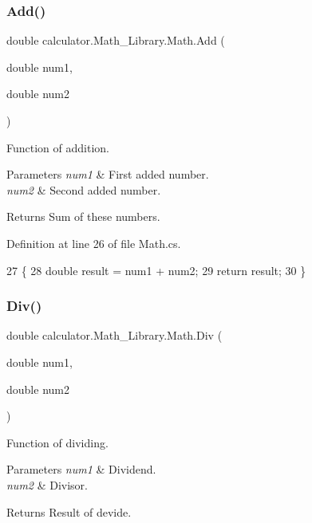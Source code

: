 \subsubsection{Add()}
{\footnotesize\ttfamily double calculator.\+Math\+\_\+\+Library.\+Math.\+Add (\begin{DoxyParamCaption}\item[{double}]{num1,  }\item[{double}]{num2 }\end{DoxyParamCaption})}



Function of addition. 


\begin{DoxyParams}{Parameters}
{\em num1} & First added number.\\
\hline
{\em num2} & Second added number.\\
\hline
\end{DoxyParams}
\begin{DoxyReturn}{Returns}
Sum of these numbers.
\end{DoxyReturn}


Definition at line 26 of file Math.\+cs.


\begin{DoxyCode}
27         \{
28             \textcolor{keywordtype}{double} result = num1 + num2;
29             \textcolor{keywordflow}{return} result;
30         \}
\end{DoxyCode}
\mbox{\label{classcalculator_1_1_math___library_1_1_math_aa767a39b7fcee6d4e63e5be56aebb64d}} 
\subsubsection{Div()}
{\footnotesize\ttfamily double calculator.\+Math\+\_\+\+Library.\+Math.\+Div (\begin{DoxyParamCaption}\item[{double}]{num1,  }\item[{double}]{num2 }\end{DoxyParamCaption})}



Function of dividing. 


\begin{DoxyParams}{Parameters}
{\em num1} & Dividend.\\
\hline
{\em num2} & Divisor.\\
\hline
\end{DoxyParams}
\begin{DoxyReturn}{Returns}
Result of devide.
\end{DoxyReturn}


